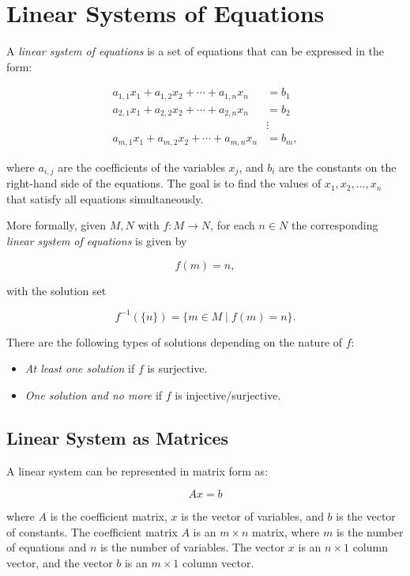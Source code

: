 \chapter{Linear Systems of Equations}

A \emph{linear system of equations} is a set of equations that can be expressed in the form:

\begin{align*}
    a_{1,1}x_1 + a_{1,2}x_2 + \cdots + a_{1,n}x_n & = b_1  \\
    a_{2,1}x_1 + a_{2,2}x_2 + \cdots + a_{2,n}x_n & = b_2  \\
                                               & \vdots \\
    a_{m,1}x_1 + a_{m,2}x_2 + \cdots + a_{m,n}x_n & = b_m,
\end{align*}

where \( a_{i,j} \) are the coefficients of the variables \( x_j \), and \( b_i \) are the constants
on the right-hand side of the equations. The goal is to find the values of \( x_1, x_2, \ldots, x_n \)
that satisfy all equations simultaneously.

More formally, given \(M, N\) with \(f: M \to N\), for each \(n \in N\) the corresponding 
\emph{linear system of equations} is given by 

\[
    f(m) = n,
\]

with the solution set 

\[
    f^{-1}(\{n\}) = \{m \in M \mid f(m) = n\}.
\]

There are the following types of solutions depending on the nature of \(f\):

\begin{itemize}
 
    \item \emph{At least one solution} if \(f\) is surjective. 
   
    \item \emph{One solution and no more} if \(f\) is injective/surjective. 

\end{itemize}

\section{Linear System as Matrices}

A linear system can be represented in matrix form as:

\[
    A x = b
\]

where \(A\) is the coefficient matrix, \(x\) is the vector of variables, and \(b\) is the vector of constants. The coefficient matrix \(A\) is an 
\( m \times n \) matrix, where \( m \) is the number of equations and \(n\) is the number of variables. The vector \(x\) is an \( n \times 1 \) column
vector, and the vector \(b\) is an \( m \times 1 \) column vector.

